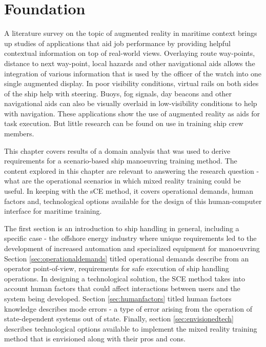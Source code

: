 \chapter{Foundation}
\label{chap:foundation}
A literature survey on the topic of augmented reality in maritime context brings up studies of applications that aid job performance by providing helpful contextual information on top of real-world views. Overlaying route way-points, distance to next way-point, local hazards and other navigational aids allows the integration of various information that is used by the officer of the watch into one single augmented display. In poor visibility conditions, virtual rails on both sides of the ship help with steering. Buoys, fog signals, day beacons and other navigational aids can also be visually overlaid in low-visibility conditions to help with navigation. These applications show the use of augmented reality as aids for task execution. But little research can be found on use in training ship crew members.

This chapter covers results of a domain analysis that was used to derive requirements for a scenario-based ship manoeuvring training method. The content explored in this chapter are relevant to answering the research question - what are the operational scenarios in which mixed reality training could be useful. In keeping with the sCE method, it covers operational demands, human factors and, technological options available for the design of this human-computer interface for maritime training. 

The first section is an introduction to ship handling in general, including a specific case - the offshore energy industry where unique requirements led to the development of increased automation and specialized equipment for manoeuvring Section \ref{sec:operationaldemands} titled operational demands describe from an operator point-of-view, requirements for safe execution of ship handling operations. In designing a technological solution, the SCE method takes into account human factors that could affect interactions between users and the system being developed. Section \ref{sec:humanfactors} titled human factors knowledge describes mode errors - a type of error arising from the operation of state-dependent systems out of state. Finally, section \ref{sec:envisionedtech} describes technological options available to implement the mixed reality training method that is envisioned along with their pros and cons.



